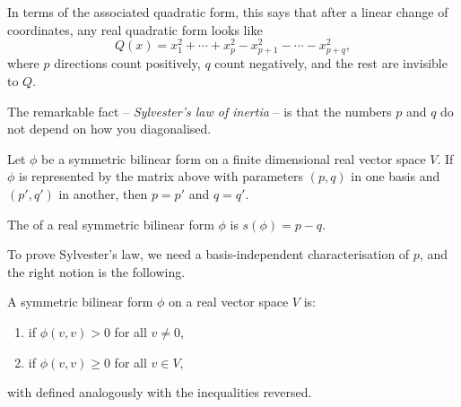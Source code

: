 \documentclass[a4paper]{scrartcl}
\begin{document}
In terms of the associated quadratic form, this says that after a linear change of coordinates, any real quadratic form looks like
$$
Q(x) = x_1^2 + \cdots + x_p^2 - x_{p+1}^2 - \cdots - x_{p + q}^2,
$$
where $p$ directions count positively, $q$ count negatively, and the rest are invisible to $Q$.
\begin{center}
\end{center}
The remarkable fact -- \emph{Sylvester's law of inertia} -- is that the numbers $p$ and $q$ do not depend on how you diagonalised.

\begin{theorem}
    Let $\phi$ be a symmetric bilinear form on a finite dimensional real vector space $V$. If $\phi$ is represented by the matrix above with parameters $(p, q)$ in one basis and $(p', q')$ in another, then $p = p'$ and $q = q'$.
\end{theorem}

\begin{definition}[Signature]
    The  of a real symmetric bilinear form $\phi$ is $s(\phi) = p - q$.
\end{definition}

To prove Sylvester's law, we need a basis-independent characterisation of $p$, and the right notion is the following.

\begin{definition}[Definiteness]
    A symmetric bilinear form $\phi$ on a real vector space $V$ is:
    \begin{enumerate}[label=(\roman*)]
        \item {} if $\phi(v, v) > 0$ for all $v \neq 0$,
        \item {} if $\phi(v,v) \geq 0$ for all $v \in V$,
    \end{enumerate}
    with  defined analogously with the inequalities reversed.
\end{definition}
\end{document}
